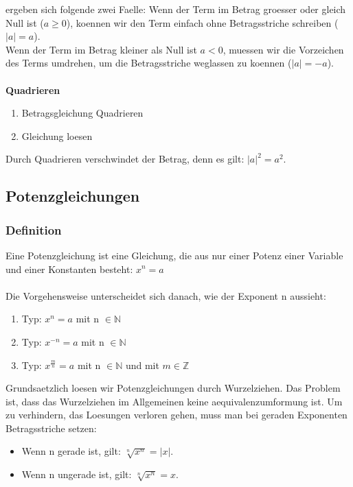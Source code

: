 \begin{multicols}{2}
    ergeben sich folgende zwei Faelle:
    Wenn der Term im Betrag groesser oder gleich Null ist ($a \geq 0$), koennen wir den Term einfach ohne Betragsstriche schreiben ($|a| = a$). \\
    Wenn der Term im Betrag kleiner als Null ist $a < 0$, muessen wir die Vorzeichen des Terms umdrehen, um die Betragsstriche weglassen zu koennen ($|a| = -a$).\\~\\
    \textbf{Quadrieren}
    \begin{enumerate}
        \item Betragsgleichung Quadrieren
        \item Gleichung loesen
    \end{enumerate}
    Durch Quadrieren verschwindet der Betrag, denn es gilt: $|a|^2 = a^2$.


    \subsection{Potenzgleichungen}
    \vspace{-4mm}
    \subsubsection{Definition}
    \vspace{-4mm}
    Eine Potenzgleichung ist eine Gleichung, die aus nur einer Potenz einer Variable und einer Konstanten besteht: $x^n = a$ \\~\\
    Die Vorgehensweise unterscheidet sich danach, wie der Exponent n aussieht:
    \begin{enumerate}
        \item Typ: $x^n = a$ mit n $\in \mathbb{N}$
        \item Typ: $x^{-n} = a$ mit n $\in \mathbb{N}$
        \item Typ: $x^{\frac{m}{n}} = a$ mit n $\in \mathbb{N}$ und mit $m \in \mathbb{Z}$
    \end{enumerate}
    Grundsaetzlich loesen wir Potenzgleichungen durch Wurzelziehen. Das Problem ist, dass das Wurzelziehen im Allgemeinen keine aequivalenzumformung ist. Um zu verhindern, das Loesungen verloren gehen, muss man bei geraden Exponenten Betragsstriche setzen:
    \begin{itemize}
        \item Wenn n gerade ist, gilt: $\sqrt[n]{x^n} = |x|$.
        \item Wenn n ungerade ist, gilt: $\sqrt[n]{x^n} = x$.
    \end{itemize}

\end{multicols}
